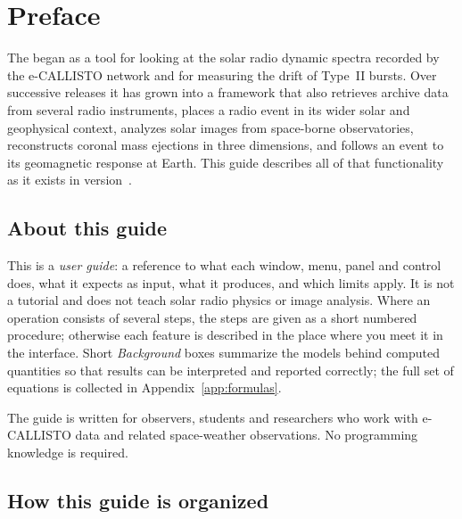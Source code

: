 \chapter{Preface}

The \appname{} began as a tool for looking at the solar radio dynamic spectra recorded by
the e-CALLISTO network and for measuring the drift of Type~II bursts. Over successive
releases it has grown into a framework that also retrieves archive data from several
radio instruments, places a radio event in its wider solar and geophysical context,
analyzes solar images from space-borne observatories, reconstructs coronal mass
ejections in three dimensions, and follows an event to its geomagnetic response at
Earth. This guide describes all of that functionality as it exists in
version~\appversion.

\section*{About this guide}

This is a \emph{user guide}: a reference to what each window, menu, panel and control does,
what it expects as input, what it produces, and which limits apply. It is not a tutorial
and does not teach solar radio physics or image analysis. Where an operation consists of
several steps, the steps are given as a short numbered procedure; otherwise each feature
is described in the place where you meet it in the interface. Short \emph{Background}
boxes summarize the models behind computed quantities so that results can be interpreted
and reported correctly; the full set of equations is collected in
Appendix~\ref{app:formulas}.

The guide is written for observers, students and researchers who work with e-CALLISTO
data and related space-weather observations. No programming knowledge is required.

\section*{How this guide is organized}

